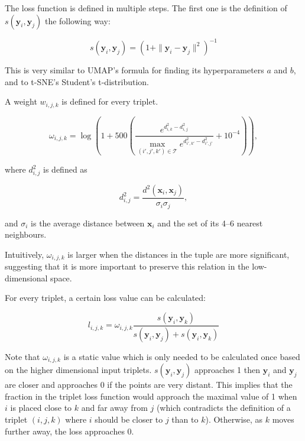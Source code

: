 The loss function is defined in multiple steps. The first one is the definition of $s(\mathbf{y}_i, \mathbf{y}_j)$ the following way:

\begin{equation}
	s(\mathbf{y}_i,\mathbf{y}_j)=\left(1+\|\mathbf{y}_i-\mathbf{y}_j\|^2\right)^{-1}
\end{equation}

This is very similar to UMAP's formula for finding its hyperparameters $a$ and $b$, and to t-SNE's Student's t-distribution.

A weight $w_{i,j,k}$ is defined for every triplet.

\begin{equation}
	\omega_{i,j,k} = \log\left(1+500\left(\frac{e^{d^2_{i,k}-d^2_{i,j}}}{\max_{(i',j',k')\in\mathcal{T}} e^{d^2_{i',k'}-d^2_{i',j'}}}+10^{-4}\right)\right),
\end{equation}

where $d^2_{i,j}$ is defined as

\begin{equation}
	\label{eq:trimap:d2}
	d^2_{i,j} = \frac{d^2(\mathbf{x}_i, \mathbf{x}_j)}{\sigma_i\sigma_j},
\end{equation}

and $\sigma_i$ is the average distance between $\mathbf{x}_i$ and the set of its 4--6 nearest neighbours.

Intuitively, $\omega_{i,j,k}$ is larger when the distances in the tuple are more significant, suggesting that it is more important to preserve this relation in the low-dimensional space.

For every triplet, a certain loss value can be calculated:

\begin{equation}
	l_{i,j,k}=\omega_{i,j,k}\frac{s(\mathbf{y}_i,\mathbf{y}_k)}{s(\mathbf{y}_i,\mathbf{y}_j)+s(\mathbf{y}_i,\mathbf{y}_k)}
\end{equation}

Note that $\omega_{i,j,k}$ is a static value which is only needed to be calculated once based on the higher dimensional input triplets. $s(\mathbf{y}_i, \mathbf{y}_j)$ approaches 1 then $\mathbf{y}_i$ and $\mathbf{y}_j$ are closer and approaches 0 if the points are very distant.  This implies that the fraction in the triplet loss function would approach the maximal value of 1 when $i$ is placed close to $k$ and far away from $j$ (which contradicts the definition of a triplet $(i,j,k)$ where $i$ should be closer to $j$ than to $k$). Otherwise, as $k$ moves further away, the loss approaches 0.

